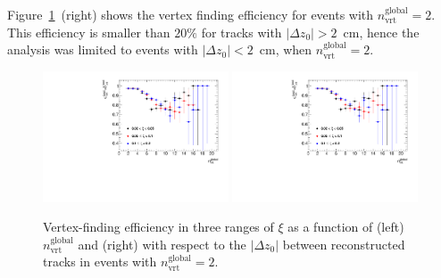 Figure~\ref{fig:vertexEffi}~(right) shows the vertex finding efficiency for events with $n^\textrm{global}_\textrm{vrt}=2$. This efficiency is smaller than $20\%$ for tracks with $|\Delta z_0|>2$~cm, hence the analysis was limited to  events with  $|\Delta z_0|<2$~cm, when $n^\textrm{global}_\textrm{vrt}=2$. 
\begin{figure}[h!]
	\centering
		\includegraphics[width=0.49\textwidth,page=1]{chapters/chrgSTAR/img/vertex/vertexEffi_ksi.pdf}
		\includegraphics[width=0.49\textwidth,page=8]{chapters/chrgSTAR/img/vertex/vertexEffi_ksi.pdf}
		\caption{Vertex-finding efficiency in three ranges of $\xi$ as a function of  (left) $n^\textrm{global}_\textrm{vrt}$ and (right) with respect to the $|\Delta z_0|$ between reconstructed tracks in events with $n^\textrm{global}_\textrm{vrt}=2$. }
		\label{fig:vertexEffi}
\end{figure}

